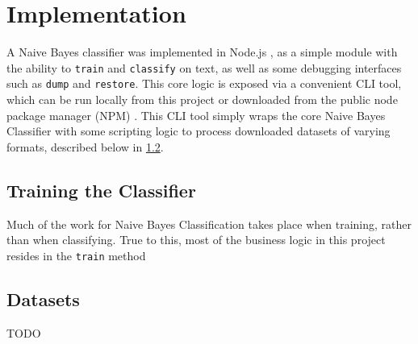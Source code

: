 \section{Implementation}
\label{section:implementation}
A Naive Bayes classifier was implemented in Node.js \cite{node}, as a simple module with the ability to \texttt{train}
and \texttt{classify} on text, as well as some debugging interfaces such as \texttt{dump} and \texttt{restore}. This
core logic is exposed via a convenient CLI tool, which can be run locally from this project or downloaded from the
public node package manager (NPM) \cite{rdn-naive-bayes}. This CLI tool simply wraps the core Naive Bayes Classifier
with some scripting logic to process downloaded datasets of varying formats,
described below in \ref{subsection:datasets}.

\subsection{Training the Classifier}
\label{subsection:training}
Much of the work for Naive Bayes Classification takes place when training, rather than when classifying. True to this,
most of the business logic in this project resides in the \texttt{train} method


\subsection{Datasets}
\label{subsection:datasets}
TODO

